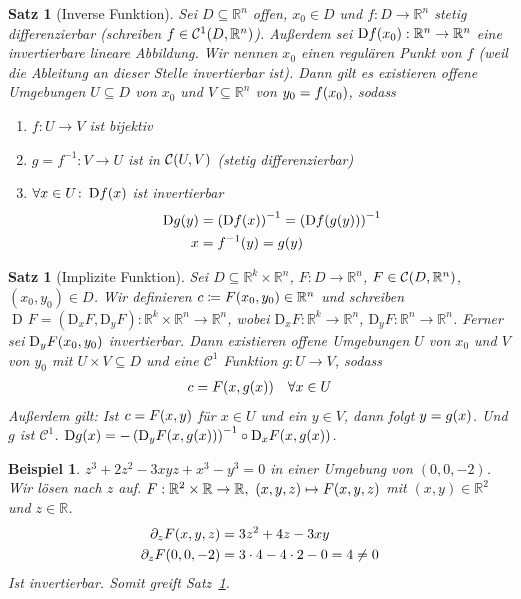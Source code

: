 \documentclass[11pt, twoside, a4paper]{article}
\theoremstyle{plain}
\newtheorem{satz}[blockelement]{Satz}
\newtheorem{beispiel}[blockelement]{Beispiel}
\numberwithin{equation}{subsection}
\newcommand{\pair}[1]{\left(#1\right)}
\newcommand{\of}[1]{\mathopen{}\mathclose{}\bgroup\left(#1\aftergroup\egroup\right)}
\newcommand{\fromto}{\rightarrow{}}
\DeclareMathOperator{\D}{D\!}
\newcommand{\R}{\mathbb{R}}
\newcommand{\mC}{\mathcal{C}}
\begin{document}
    \begin{satz}[Inverse Funktion] %
        \label{satz:invers-funktion}
        Sei $D\subseteq\R^n$ offen, $x_0\in D$ und $f: D\to\R^n$ stetig differenzierbar (schreiben $f\in\mC^1\of{D, \R^n}$). Außerdem sei $\D f\of{x_0}: \R^n\to\R^n$ eine invertierbare lineare Abbildung. Wir nennen $x_0$ einen regulären Punkt von $f$ (weil die Ableitung an dieser Stelle invertierbar ist). Dann gilt es existieren offene Umgebungen $U\subseteq D$ von $x_0$ und $V\subseteq\R^n$ von $y_0 = f\of{x_0}$, sodass
        \begin{enumerate}[label=(\roman*)]
            \item $f: U\to V$ ist bijektiv
            \item $g=f^{-1}: V\to U$ ist in $\mC\of{U, V}$ (stetig differenzierbar)
            \item $\forall x\in U\colon \D f\of{x}$ ist invertierbar
            \begin{align*}
                \D g\of{y} &= \pair{\D f\of{x}}^{-1} = \pair{\D f\of{g\of{y}}}^{-1}\\
                x &= f^{-1}\of{y} = g\of{y}
            \end{align*}
        \end{enumerate}
    \end{satz}

    \begin{satz}[Implizite Funktion] %
        \label{satz:implizit-funktion}
        Sei $D\subseteq\R^k\times\R^n$, $F: D\fromto\R^n$, $F\in\mC\of{D, \R^n}$, $\pair{x_0, y_0}\in D$. Wir definieren $c\coloneqq F\of{x_0, y_0}\in\R^n$ und schreiben $\D F = \pair{\text{D}_x F, \text{D}_y F}: \R^k\times \R^n\to\R^n$, wobei $\text{D}_x F: \R^k\to\R^n$, $\text{D}_y F: \R^n\to\R^n$. Ferner sei $\text{D}_y F\of{x_0, y_0}$ invertierbar. Dann existieren offene Umgebungen $U$ von $x_0$ und $V$ von $y_0$ mit $U\times V \subseteq D$ und eine $\mC^{1}$ Funktion $g: U\to V$, sodass
        \begin{align*}
            c = F\of{x, g\of{x}}\quad\forall x\in U
        \end{align*}
        Außerdem gilt: Ist $c=F\of{x,y}$ für $x\in U$ und ein $y\in V$, dann folgt $y=g\of{x}$. Und $g$ ist $\mC^1$. $\D g\of{x} = -\pair{\text{D}_y F\of{x, g\of{x}}}^{-1}\circ \text{D}_x F\of{x,g\of{x}}$.
    \end{satz}

    \begin{beispiel}
        $z^3 + 2z^2 - 3xyz + x^3 - y^3 = 0$ in einer Umgebung von $\pair{0,0,-2}$. Wir lösen nach $z$ auf. $F: \R^2\times\R\to\R,~\pair{x,y,z}\mapsto F\of{x,y,z}$ mit $\pair{x,y}\in\R^2$ und $z\in\R$.
        \begin{align*}
            \partial_z F\of{x,y,z} &= 3z^2 + 4z - 3xy\\
            \partial_z F\of{0,0,-2} &= 3\cdot 4 - 4\cdot 2 - 0 = 4\neq 0
        \end{align*}
        Ist invertierbar. Somit greift Satz~\ref{satz:implizit-funktion}.
    \end{beispiel}
\end{document}
